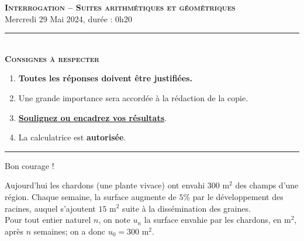 \documentclass[11pt]{article}
\begin{document}
%
%
%

\begin{center}
\textbf{\LARGE \textsc{Interrogation -- Suites arithmétiques et
géométriques}}\\[2mm]

{\large Mercredi 29 Mai 2024, durée : 0h20}\\[1mm]
\noindent\rule{8cm}{0.4pt}\\[1mm]
\textbf{\textsc{Consignes à respecter}}
\begin{enumerate}[label=\textbf{\arabic*/}]
\item \textbf{Toutes les réponses doivent être justifiées.}
\item Une grande importance sera accordée à la rédaction de la
  copie.
\item \underline{\textbf{Soulignez ou encadrez vos résultats}}.
\item La calculatrice est \textbf{autorisée}.
\end{enumerate}
\noindent\rule{12cm}{0.4pt}
\end{center}

\begin{center}
  Bon courage !
\end{center}

Aujourd'hui les chardons (une plante vivace) ont envahi $300$ m$^2$ des champs
d'une région. Chaque semaine, la surface augmente de $5\%$ par le développement
des racines, auquel s'ajoutent $15$ m$^2$ suite à la dissémination des
graines.\\[5mm]
Pour tout entier naturel $n$, on note $u_n$ la surface envahie par les chardons,
en m$^2$, après $n$ semaines; on a donc $u_0=300$ m$^2$.\\[5mm]
\end{document}
